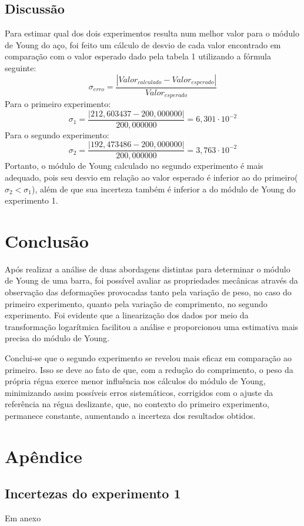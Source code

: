 \documentclass{article}
\begin{document}
\subsection{Discussão}
Para estimar qual dos dois experimentos resulta num melhor valor para o módulo de Young do aço, foi feito um cálculo de desvio de cada valor encontrado em comparação com o valor esperado dado pela tabela 1 utilizando a fórmula seguinte:
\begin{equation}
    \sigma_{erro} = \frac{|Valor_{calculado} - Valor_{esperado}|}{Valor_{esperado}}
\end{equation}
Para o primeiro experimento:
\[
    \sigma_{1} = \frac{|212,603437 - 200,000000|}{200,000000} = 6,301\cdot 10^{-2}
\]
Para o segundo experimento:
\[
    \sigma_{2} = \frac{|192,473486 - 200,000000|}{200,000000} = 3,763\cdot 10^{-2}
\]
Portanto, o módulo de Young calculado no segundo experimento é mais adequado, pois seu desvio em relação ao valor esperado é inferior ao do primeiro($\sigma_2 < \sigma_1$), além de que sua incerteza também é inferior a do módulo de Young do experimento 1.

\section{Conclusão}
Após realizar a análise de duas abordagens distintas para determinar o módulo de Young de uma barra, foi possível avaliar as propriedades mecânicas através da observação das deformações provocadas tanto pela variação de peso, no caso do primeiro experimento, quanto pela variação de comprimento, no segundo experimento. Foi evidente que a linearização dos dados por meio da transformação logarítmica facilitou a análise e proporcionou uma estimativa mais precisa do módulo de Young.

Conclui-se que o segundo experimento se revelou mais eficaz em comparação ao primeiro. Isso se deve ao fato de que, com a redução do comprimento, o peso da própria régua exerce menor influência nos cálculos do módulo de Young, minimizando assim possíveis erros sistemáticos, corrigidos com o ajuste da referência na régua deslizante, que, no contexto do primeiro experimento, permanece constante, aumentando a incerteza dos resultados obtidos.

\section{Apêndice}
\subsection{Incertezas do experimento 1}
Em anexo
\end{document}
